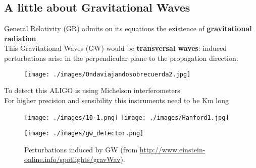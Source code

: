 \documentclass[10pt]{beamer}
\begin{document}
\subsection{A little about Gravitational Waves}
\begin{frame}
General Relativity (GR) admits on its equations the existence of \textbf{gravitational radiation}.\\ 
\bigskip
This Gravitational Waves (GW) would be \textbf{transversal waves}: induced perturbations arise in the 
perpendicular plane to the propagation direction.\\ \pause
\begin{figure}
 \centering
\begin{center}
 \texttt{[image: ./images/Ondaviajandosobrecuerda2.jpg]}
\end{center}
\end{figure}
\end{frame}
\begin{frame}
To detect this ALIGO is using Michelson interferometers\\ \pause 
For higher precision and sensibility this instruments need to be Km long
\begin{figure}%
   \centering
    \texttt{[image: ./images/10-1.png]}
 \texttt{[image: ./images/Hanford1.jpg]}
  \end{figure}
\end{frame}
\begin{frame}
\begin{figure}%
   \begin{center}
 \texttt{[image: ./images/gw\_detector.png]}
  \caption{\scriptsize{Perturbations induced by GW (from \url{http://www.einstein-online.info/spotlights/gravWav}).}}
\end{center}
 \end{figure}
\end{frame}
\end{document}
